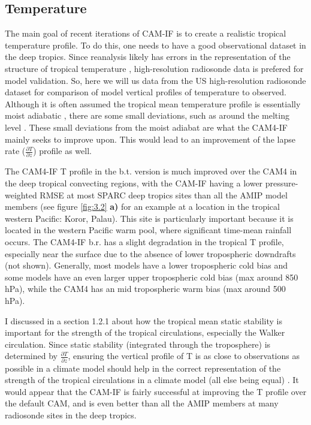 \documentclass[letterpaper,12pt,titlepage,oneside,final]{book}
\begin{document}
\subsection{Temperature}
The main goal of recent iterations of CAM-IF is to create a realistic tropical temperature profile. To do this, one needs to have a good observational dataset in the deep tropics. Since reanalysis likely has errors in the representation of the structure of tropical temperature \citep{mitas_recent_2006}, high-resolution radiosonde data is prefered for model validation. So, here we will us data from the US high-resolution radiosonde dataset \citep{love_us_nodate} for comparison of model vertical profiles of temperature to observed. Although it is often assumed the tropical mean temperature profile is essentially moist adiabatic \citep{emanuel_quasi-equilibrium_2007}, there are some small deviations, such as around the melting level \citep{folkins_melting_2013}. These small deviations from the moist adiabat are what the CAM4-IF mainly seeks to improve upon. This would lead to an improvement of the lapse rate ($\frac{\partial{T}}{\partial{z}}$) profile as well. 

The CAM4-IF T profile in the b.t. version is much improved over the CAM4 in the deep tropical convecting regions, with the CAM-IF having a lower pressure-weighted RMSE at most SPARC deep tropics sites than all the AMIP model members (see figure \ref{fig:3.2} \textbf{a)} for an example at a location in the tropical western Pacific: Koror, Palau). This site is particularly important because it is located in the western Pacific warm pool, where significant time-mean rainfall occurs. The CAM4-IF b.r. has a slight degradation in the tropical T profile, especially near the surface due to the absence of lower tropospheric downdrafts (not shown). Generally, most models have a lower tropospheric cold bias and some models have an even larger upper tropospheric cold bias (max around 850 hPa), while the CAM4 has an mid tropospheric warm bias (max around 500 hPa). 

I discussed in a section 1.2.1 about how the tropical mean static stability is important for the strength of the tropical circulations, especially the Walker circulation. Since static stability (integrated through the troposphere) is determined by $\frac{\partial{T}}{\partial{z}}$, ensuring the vertical profile of T is as close to observations as possible in a climate model should help in the correct representation of the strength of the tropical circulations in a climate model (all else being equal) \citep{sohn_role_2016,mitas_recent_2006}. It would appear that the CAM-IF is fairly successful at improving the T profile over the default CAM, and is even better than all the AMIP members at many radiosonde sites in the deep tropics. 
\end{document}
